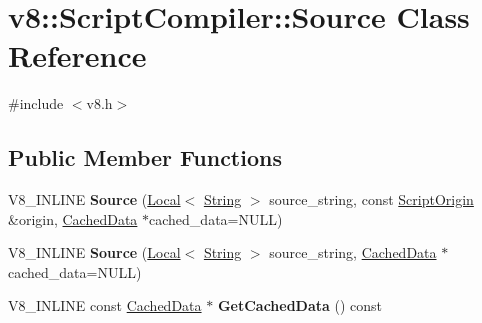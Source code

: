 \hypertarget{classv8_1_1_script_compiler_1_1_source}{}\section{v8\+:\+:Script\+Compiler\+:\+:Source Class Reference}
\label{classv8_1_1_script_compiler_1_1_source}


{\ttfamily \#include $<$v8.\+h$>$}

\subsection*{Public Member Functions}
\begin{DoxyCompactItemize}
\item 
V8\+\_\+\+I\+N\+L\+I\+NE {\bfseries Source} (\hyperlink{classv8_1_1_local}{Local}$<$ \hyperlink{classv8_1_1_string}{String} $>$ source\+\_\+string, const \hyperlink{classv8_1_1_script_origin}{Script\+Origin} \&origin, \hyperlink{structv8_1_1_script_compiler_1_1_cached_data}{Cached\+Data} $\ast$cached\+\_\+data=N\+U\+LL)\hypertarget{classv8_1_1_script_compiler_1_1_source_ae71a5fe18124d71f9acfcc872310d586}{}\label{classv8_1_1_script_compiler_1_1_source_ae71a5fe18124d71f9acfcc872310d586}

\item 
V8\+\_\+\+I\+N\+L\+I\+NE {\bfseries Source} (\hyperlink{classv8_1_1_local}{Local}$<$ \hyperlink{classv8_1_1_string}{String} $>$ source\+\_\+string, \hyperlink{structv8_1_1_script_compiler_1_1_cached_data}{Cached\+Data} $\ast$cached\+\_\+data=N\+U\+LL)\hypertarget{classv8_1_1_script_compiler_1_1_source_ad46e9d298cf3199c3a570182a680449d}{}\label{classv8_1_1_script_compiler_1_1_source_ad46e9d298cf3199c3a570182a680449d}

\item 
V8\+\_\+\+I\+N\+L\+I\+NE const \hyperlink{structv8_1_1_script_compiler_1_1_cached_data}{Cached\+Data} $\ast$ {\bfseries Get\+Cached\+Data} () const \hypertarget{classv8_1_1_script_compiler_1_1_source_a7cef3113a46627fefa3110132acf47d2}{}\label{classv8_1_1_script_compiler_1_1_source_a7cef3113a46627fefa3110132acf47d2}

\end{DoxyCompactItemize}
